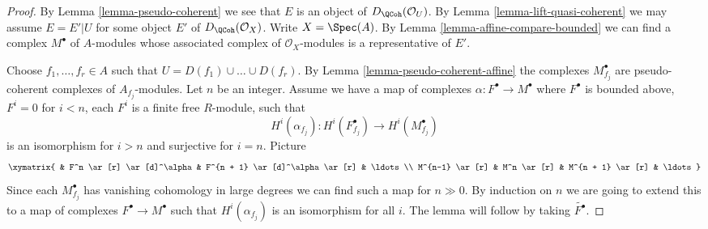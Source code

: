 \begin{proof}
By Lemma \ref{lemma-pseudo-coherent} we see that $E$ is an object of
$D_\QCoh(\mathcal{O}_U)$. By
Lemma \ref{lemma-lift-quasi-coherent}
we may assume $E = E'|U$ for some object $E'$ of
$D_\QCoh(\mathcal{O}_X)$.
Write $X = \Spec(A)$. By Lemma \ref{lemma-affine-compare-bounded}
we can find a complex $M^\bullet$ of $A$-modules whose associated
complex of $\mathcal{O}_X$-modules is a representative of $E'$.

\medskip\noindent
Choose $f_1, \ldots, f_r \in A$ such that $U = D(f_1) \cup \ldots \cup D(f_r)$.
By Lemma \ref{lemma-pseudo-coherent-affine} the complexes
$M^\bullet_{f_j}$ are pseudo-coherent complexes of $A_{f_j}$-modules.
Let $n$ be an integer. Assume we have a map of complexes
$\alpha : F^\bullet \to M^\bullet$ where $F^\bullet$ is
bounded above, $F^i = 0$ for $i < n$, each $F^i$ is a finite free
$R$-module, such that
$$
H^i(\alpha_{f_j}) : H^i(F^\bullet_{f_j}) \to H^i(M^\bullet_{f_j})
$$
is an isomorphism for $i > n$ and surjective for $i = n$. Picture
$$
\xymatrix{
& F^n \ar[r] \ar[d]^\alpha & F^{n + 1} \ar[d]^\alpha \ar[r] & \ldots \\
M^{n-1} \ar[r] & M^n \ar[r] & M^{n + 1} \ar[r] & \ldots
}
$$
Since each $M^\bullet_{f_j}$ has vanishing cohomology
in large degrees we can find such a map for $n \gg 0$.
By induction on $n$ we are going to extend this to a map
of complexes $F^\bullet \to M^\bullet$
such that $H^i(\alpha_{f_j})$ is an isomorphism
for all $i$. The lemma will follow by taking $\widetilde{F^\bullet}$.


\end{proof}
